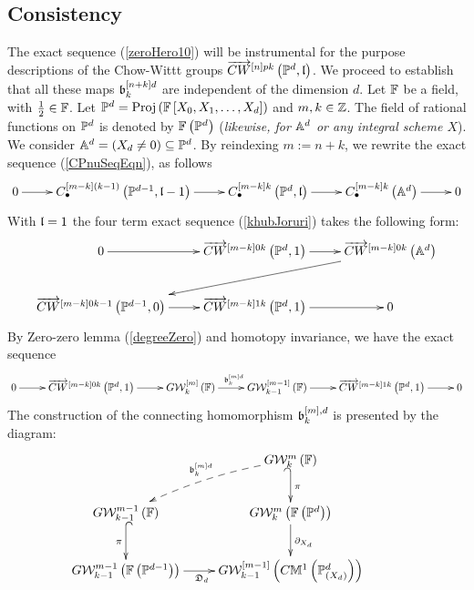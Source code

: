 \documentclass[12pt]{article}
\begin{document}
  \subsection{Consistency} 
  The exact sequence (\ref{zeroHero10}) will be instrumental for the purpose descriptions of 
  the  Chow-Wittt groups $\overrightarrow{CW}^{\left[ n\right]pk}\left( {\mathbb{P}}^d, \mathfrak {l}\right)$. 
  We proceed to establish that all these maps 
  $\mathfrak {b}^{\left[ n+k\right]d}_{k}$  are independent of the dimension $d$. 
  \bN\label{notaVott}{\rm 
  Let ${\mathbb{F}}$ be a field, with $\frac{1}{2}\in {\mathbb{F}}$. Let 
  ${\mathbb{P}}^d=\mathrm{Proj}\left({\mathbb{F}}\left[ X_0, X_1, \ldots, X_d\right]\right)$ and $m, k\in {\mathbb {Z}}$. 
  The field of rational functions on ${\mathbb{P}}^d$ is denoted by 
  ${\mathbb{F}}\left( {\mathbb{P}}^d\right)$ ({\it likewise, for ${\mathbb{A}}^d$ or any integral scheme $X$}). We consider ${\mathbb{A}}^d=\left( X_d\neq 0\right)\subseteq {\mathbb{P}}^d$. 
     }
  \eN
By reindexing $m:=n+k$,  we rewrite  the exact sequence (\ref{CPnuSeqEqn}), as follows
\begin{equation}\label{ReinIndSeqEqn}
\diagram 
0 \ar[r] & C^{\LRt{m-k}(k-1)}_{\bul}\LRf{{\BP}^{d-1},  \l-1} \ar[r] & C^{\LRt{m-k}k}_{\bul}\LRf{{\BP}^d, \l} \ar[r] &  C^{\LRt{m-k}k}_{\bul}\LRf{{\BA}^{d}} \ar[r] & 0\\
\enddiagram
\end{equation}
%
With $\mathfrak {l}=1$ the  four term exact sequence (\ref{khubJoruri}) takes the following form:
\begin{equation}\label{minx4Term}
\diagram 
0  \ar[r] & \ora{CW}^{\LRt{m-k}0k}\LRf{{\BP}^d, 1} \ar[r] &  \ora{CW}^{\LRt{m-k}0k}\LRf{{\BA}^d}\ar[dll] \\
\ora{CW}^{\LRt{m-k}0k-1}\LRf{{\BP}^{d-1}, 0} \ar[r] & \ora{CW}^{\LRt{m-k}1k}\LRf{{\BP}^d, 1} \ar[r]&0\\
\enddiagram
\end{equation}
By Zero-zero lemma (\ref{degreeZero})  and homotopy invariance, we have the exact sequence 
\begin{equation}\label{minx42ndTerm}
\diagram 
0  \ar[r] & \ora{CW}^{\LRt{m-k}0k}\LRf{{\BP}^d, 1} \ar[r] & G{\CW}^{\LRt{m}}_k\LRf{{\BF}}\ar[r]^{\b^{\LRt{m} d}_k} &
G{\CW}^{\LRt{m-1}}_{k-1}\LRf{{\BF}} %
\ar[r] & \ora{CW}^{\LRt{m-k}1k}\LRf{{\BP}^d, 1} \ar[r]&0\\
\enddiagram
\end{equation}
 The construction of the connecting homomorphism $\mathfrak {b}^{\left[ m\right], d}_k$ is presented by the diagram: 
\begin{equation}\label{VottNtaDef}
\diagram 
& G{\CW}^{m}_k\LRf{{\BF}}\ar@{_(->}[d]^{\pi}  \ar@/_/@{-->}[ld]_{\b^{\LRt{m}d}_k}
 \\
 G{\CW}^{m-1}_{k-1}\LRf{{\BF}}\ar@{^(->}[d]_{\pi}&G{\CW}^{m}_k\LRf{{\BF}\LRf{{\BP}^d}}%
   \ar[d]^{\partial_{X_d}}&\\
% 
G{\CW}^{m-1}_{k-1}\LRf{{\BF}\LRf{{\BP}^{d-1}}}%
\ar[r]_{\D_d\quad}  
%
&G{\CW}_{k-1}^{\LRt{m-1}}\LRf{C{\BM}^1\LRf{{\BP}_{\LRf{X_d}}^d}}&
  \\
\enddiagram
\end{equation} 
\end{document}
